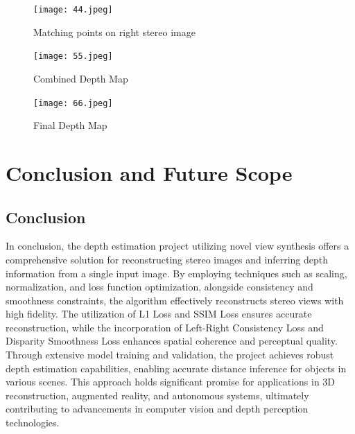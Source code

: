 \documentclass[12pt,a4paper]{report}
\begin{document}
\begin{figure}[htp]
\centering
    \texttt{[image: 44.jpeg]}
  \caption{Matching points on right stereo image}
  \label{figa2}
\end{figure}

\begin{figure}[htp]
\centering
    \texttt{[image: 55.jpeg]}
  \caption{Combined Depth Map}
  \label{figa2}
\end{figure}

\begin{figure}[htp]
\centering
    \texttt{[image: 66.jpeg]}
  \caption{Final Depth Map}
  \label{figa2}
\end{figure}



\newpage
\chapter{Conclusion and Future Scope}
\section{Conclusion}

In conclusion, the depth estimation project utilizing novel view synthesis offers a comprehensive solution for reconstructing stereo images and inferring depth information from a single input image. By employing techniques such as scaling, normalization, and loss function optimization, alongside consistency and smoothness constraints, the algorithm effectively reconstructs stereo views with high fidelity. The utilization of L1 Loss and SSIM Loss ensures accurate reconstruction, while the incorporation of Left-Right Consistency Loss and Disparity Smoothness Loss enhances spatial coherence and perceptual quality. Through extensive model training and validation, the project achieves robust depth estimation capabilities, enabling accurate distance inference for objects in various scenes. This approach holds significant promise for applications in 3D reconstruction, augmented reality, and autonomous systems, ultimately contributing to advancements in computer vision and depth perception technologies.
\end{document}
